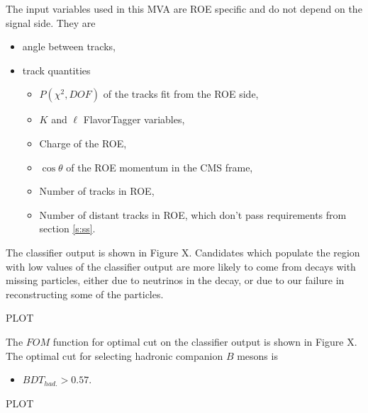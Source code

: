 \documentclass[oneside,a4paper,openany,12pt]{scrbook}
\begin{document}
The input variables used in this MVA are ROE specific and do not depend on the signal side. They are
\begin{itemize}
\item angle between tracks,
\item track quantities
	\begin{itemize}
	\item $P(\chi^2,DOF)$ of the tracks fit from the ROE side,
	\item $K$ and $\ell$ FlavorTagger variables,
	\item Charge of the ROE,
	\item $\cos \theta$ of the ROE momentum in the CMS frame,
	\item Number of tracks in ROE,
	\item Number of distant tracks in ROE, which don't pass requirements from section \ref{s:ss}.
	\end{itemize}
\end{itemize}
%
The classifier output is shown in Figure X. Candidates which populate the region with low values of the classifier output are more likely to come from decays with missing particles, either due to neutrinos in the decay, or due to our failure in reconstructing some of the particles.

PLOT
%
%

The $FOM$ function for optimal cut on the classifier output is shown in Figure X. The optimal cut for selecting hadronic companion $B$ mesons is
\begin{itemize}
\item $BDT_{had.} > 0.57.$
\end{itemize}

PLOT

%
\end{document}
